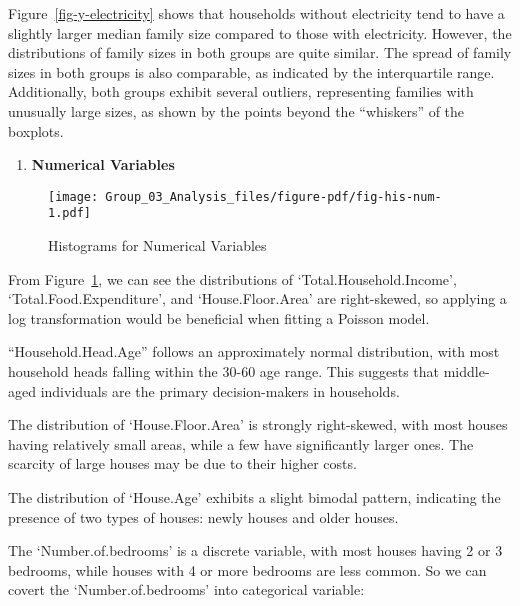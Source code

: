 \documentclass[
]{article}
\providecommand{\tightlist}{%
  \setlength{\itemsep}{0pt}\setlength{\parskip}{0pt}}\usepackage{longtable,booktabs,array}
\begin{document}
Figure~\ref{fig-y-electricity} shows that households without electricity
tend to have a slightly larger median family size compared to those with
electricity. However, the distributions of family sizes in both groups
are quite similar. The spread of family sizes in both groups is also
comparable, as indicated by the interquartile range. Additionally, both
groups exhibit several outliers, representing families with unusually
large sizes, as shown by the points beyond the ``whiskers'' of the
boxplots.

\begin{enumerate}
\def\labelenumi{\arabic{enumi}.}
\setcounter{enumi}{1}
\tightlist
\item
  \textbf{Numerical Variables}
\end{enumerate}

\begin{figure}[H]

{\centering \texttt{[image: Group\_03\_Analysis\_files/figure-pdf/fig-his-num-1.pdf]}

}

\caption{\label{fig-his-num}Histograms for Numerical Variables}

\end{figure}

From Figure~\ref{fig-his-num}, we can see the distributions of
`Total.Household.Income', `Total.Food.Expenditure', and
`House.Floor.Area' are right-skewed, so applying a log transformation
would be beneficial when fitting a Poisson model.

``Household.Head.Age'' follows an approximately normal distribution,
with most household heads falling within the 30-60 age range. This
suggests that middle-aged individuals are the primary decision-makers in
households.

The distribution of `House.Floor.Area' is strongly right-skewed, with
most houses having relatively small areas, while a few have
significantly larger ones. The scarcity of large houses may be due to
their higher costs.

The distribution of `House.Age' exhibits a slight bimodal pattern,
indicating the presence of two types of houses: newly houses and older
houses.

The `Number.of.bedrooms' is a discrete variable, with most houses having
2 or 3 bedrooms, while houses with 4 or more bedrooms are less common.
So we can covert the `Number.of.bedrooms' into categorical variable:
\end{document}
